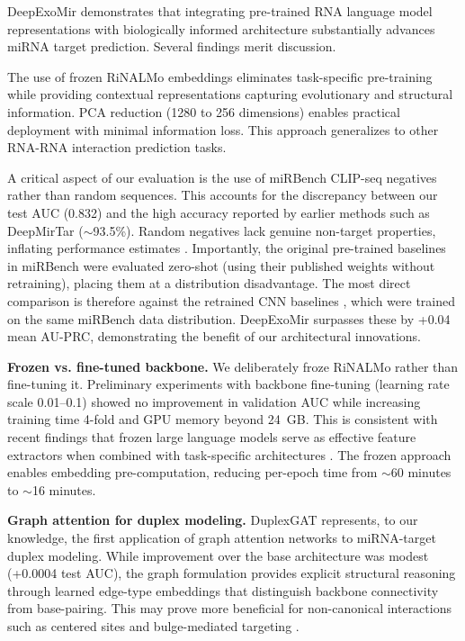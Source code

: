 \documentclass[unnumsec,webpdf,contemporary,large]{oup-authoring-template}
\begin{document}
DeepExoMir demonstrates that integrating pre-trained RNA language model representations with biologically informed architecture substantially advances miRNA target prediction. Several findings merit discussion.

The use of frozen RiNALMo embeddings eliminates task-specific pre-training while providing contextual representations capturing evolutionary and structural information. PCA reduction (1280 to 256 dimensions) enables practical deployment with minimal information loss. This approach generalizes to other RNA-RNA interaction prediction tasks.

A critical aspect of our evaluation is the use of miRBench CLIP-seq negatives rather than random sequences. This accounts for the discrepancy between our test AUC (0.832) and the high accuracy reported by earlier methods such as DeepMirTar ($\sim$93.5\%). Random negatives lack genuine non-target properties, inflating performance estimates \citep{sammut2025}. Importantly, the original pre-trained baselines in miRBench were evaluated zero-shot (using their published weights without retraining), placing them at a distribution disadvantage. The most direct comparison is therefore against the retrained CNN baselines \citep{sammut2025}, which were trained on the same miRBench data distribution. DeepExoMir surpasses these by +0.04 mean AU-PRC, demonstrating the benefit of our architectural innovations.

\textbf{Frozen vs. fine-tuned backbone.} We deliberately froze RiNALMo rather than fine-tuning it. Preliminary experiments with backbone fine-tuning (learning rate scale 0.01--0.1) showed no improvement in validation AUC while increasing training time 4-fold and GPU memory beyond 24~GB. This is consistent with recent findings that frozen large language models serve as effective feature extractors when combined with task-specific architectures \citep{bommasani2021,ji2021}. The frozen approach enables embedding pre-computation, reducing per-epoch time from $\sim$60 minutes to $\sim$16 minutes.

\textbf{Graph attention for duplex modeling.} DuplexGAT represents, to our knowledge, the first application of graph attention networks to miRNA-target duplex modeling. While improvement over the base architecture was modest (+0.0004 test AUC), the graph formulation provides explicit structural reasoning through learned edge-type embeddings that distinguish backbone connectivity from base-pairing. This may prove more beneficial for non-canonical interactions such as centered sites \citep{shin2010} and bulge-mediated targeting \citep{chi2012}.
\end{document}
